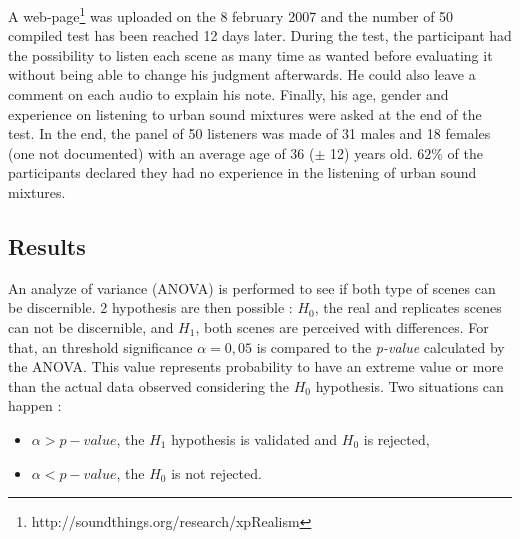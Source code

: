 \documentclass[a4,11pt,twocolumn]{article}
\begin{document}
A web-page\footnote{http://soundthings.org/research/xpRealism} was uploaded on the 8 february 2007 and the number of 50 compiled test has been reached 12 days later. During the test, the participant had the possibility to listen each scene as many time as wanted before evaluating it without being able to change his judgment afterwards. He could also leave a comment on each audio to explain his note. Finally, his age, gender and experience on listening to urban sound mixtures were asked at the end of the test. In the end, the panel of 50 listeners was made of 31 males and 18 females (one not documented) with an average age of 36 ($\pm$ 12) years old. $62\%$ of the participants declared they had no experience in the listening of urban sound mixtures.\\




\subsection{Results}

An analyze of variance (ANOVA) is performed to see if both type of scenes can be discernible. 2 hypothesis are then possible : $H_0$, the real and replicates scenes can not be discernible, and $H_1$, both scenes are perceived with differences. For that, an threshold significance $\alpha=0,05$ is compared to the \textit{p-value} calculated by the ANOVA. This value represents probability to have an extreme value or more than the actual data observed considering the $H_0$ hypothesis. Two situations can happen :
\begin{itemize}
\item $\alpha > p-value$, the $H_1$ hypothesis is validated and $H_0$ is rejected,
\item $\alpha < p-value$, the $H_0$ is not rejected.
\end{itemize}
\end{document}
